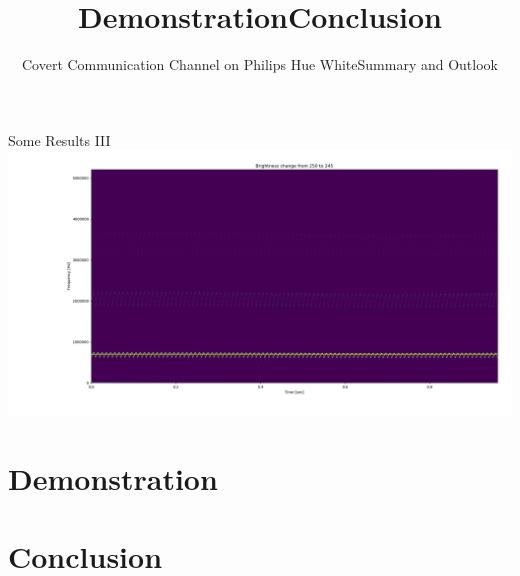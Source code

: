 \documentclass[11pt,t,usepdftitle=false,aspectratio=169]{beamer}
\begin{document}
\begin{frame}{Some Results III}
	\includegraphics[width=\textwidth]{../experiment/250-245.png}
\end{frame}


\title{Demonstration}
\subtitle{Covert Communication Channel on Philips Hue White}
\section{Demonstration} %
\label{sec:demonstration}


\title{Conclusion}
\subtitle{Summary and Outlook}
\section{Conclusion} %
\label{sec:conclusion}
\end{document}
